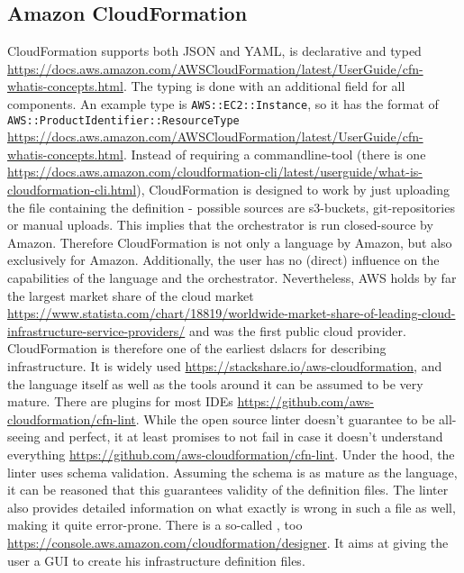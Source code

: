 \subsection{Amazon CloudFormation}
CloudFormation supports both JSON and YAML, is declarative and typed \url{https://docs.aws.amazon.com/AWSCloudFormation/latest/UserGuide/cfn-whatis-concepts.html}. The typing is done with an additional field  for all components. An example type is \texttt{AWS::EC2::Instance}, so it has the format of \texttt{AWS::ProductIdentifier::ResourceType} \url{https://docs.aws.amazon.com/AWSCloudFormation/latest/UserGuide/cfn-whatis-concepts.html}.
\newline
Instead of requiring a commandline-tool (there is one \url{https://docs.aws.amazon.com/cloudformation-cli/latest/userguide/what-is-cloudformation-cli.html}), CloudFormation is designed to work by just uploading the file containing the definition - possible sources are s3-buckets, git-repositories or manual uploads. This implies that the orchestrator is run closed-source by Amazon. Therefore CloudFormation is not only a language by Amazon, but also exclusively for Amazon. Additionally, the user has no (direct) influence on the capabilities of the language and the orchestrator.
\newline
Nevertheless, AWS holds by far the largest market share of the cloud market \url{https://www.statista.com/chart/18819/worldwide-market-share-of-leading-cloud-infrastructure-service-providers/} and was the first public cloud provider. CloudFormation is therefore one of the earliest \gls{dslacr}s for describing infrastructure. It is widely used \url{https://stackshare.io/aws-cloudformation}, and the language itself as well as the tools around it can be assumed to be very mature. There are plugins for most IDEs \url{https://github.com/aws-cloudformation/cfn-lint}. While the open source linter doesn't guarantee to be all-seeing and perfect, it at least promises to not fail in case it doesn't understand everything \url{https://github.com/aws-cloudformation/cfn-lint}. Under the hood, the linter uses schema validation. Assuming the schema is as mature as the language, it can be reasoned that this guarantees validity of the definition files. The linter also provides detailed information on what exactly is wrong in such a file as well, making it quite error-prone. There is a so-called , too \url{https://console.aws.amazon.com/cloudformation/designer}. It aims at giving the user a GUI to create his infrastructure definition files.
